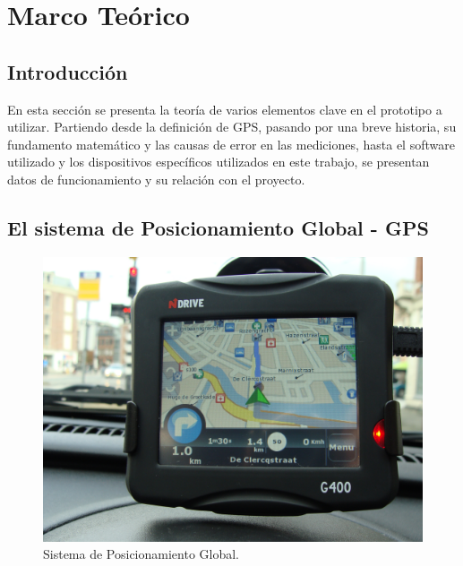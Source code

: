 
\chapter{Marco Teórico} %

\label{Chap:Marco} %




\section{Introducción}

En esta sección se presenta la teoría de varios elementos clave en el prototipo a utilizar. Partiendo desde la definición de GPS, pasando por una breve historia, su fundamento matemático y las causas de error en las mediciones, hasta el software utilizado y los dispositivos específicos utilizados en este trabajo, se presentan datos de funcionamiento y su relación con el proyecto.

\section{El sistema de Posicionamiento Global - GPS}

\begin{figure}[ht]
\centering
\includegraphics[scale=0.07]{Figures/GPS}
\caption[Sistema de Posicionamiento Global.]{Sistema de Posicionamiento Global.}
\label{fig:GPS}
\end{figure}

